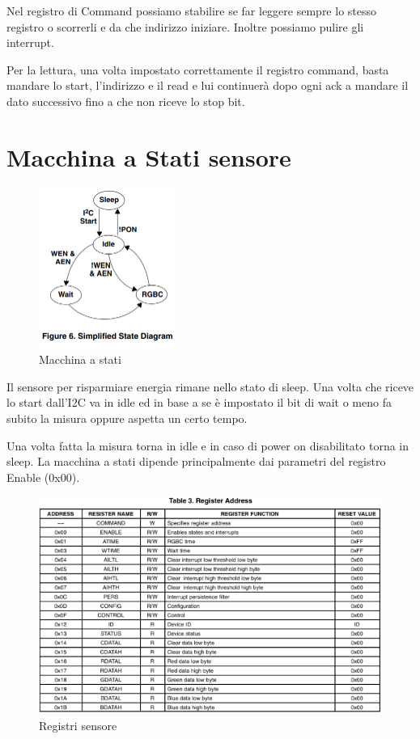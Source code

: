 \documentclass[12pt]{report}
\begin{document}
Nel registro di Command possiamo stabilire se far leggere sempre lo stesso registro o scorrerli e da che indirizzo iniziare. Inoltre possiamo pulire gli interrupt.

Per la lettura, una volta impostato correttamente il registro command, basta mandare lo start, l'indirizzo e il read e lui continuerà dopo ogni ack a mandare il dato successivo fino a che non riceve lo stop bit.

\section{Macchina a Stati sensore}
\begin{figure}
    \centering
    \includegraphics[width=0.4\textwidth]{Immagini_sensore/macchina_a_stati.png}
    \caption{Macchina a stati}
\end{figure}

Il sensore per risparmiare energia rimane nello stato di sleep. Una volta che riceve lo start dall'I2C va in idle ed in base a se è impostato il bit di wait o meno fa subito la misura oppure aspetta un certo tempo.

Una volta fatta la misura torna in idle e in caso di power on disabilitato torna in sleep. La macchina a stati dipende principalmente dai parametri del registro Enable (0x00).

\begin{figure}
    \includegraphics[width=\textwidth]{Immagini_sensore/Indirizzi_sensore.png}
    \caption{Registri sensore}
\end{figure} 
\end{document}

